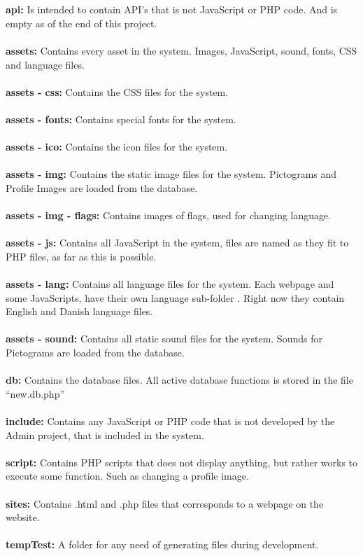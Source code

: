 \\
\\
\textbf{api:} Is intended to contain API's that is not JavaScript or PHP code. And is empty as of the end of this project.\\
\\
\textbf{assets:} Contains every asset in the system. Images, JavaScript, sound, fonts, CSS and language files.\\
\\
\textbf{assets - css:} Contains the CSS files for the system.\\
\\
\textbf{assets - fonts:} Contains special fonts for the system.\\
\\
\textbf{assets - ico:} Contains the icon files for the system.\\
\\
\textbf{assets - img:} Contains the static image files for the system. Pictograms and Profile Images are loaded from the database.\\
\\
\textbf{assets - img - flags:} Contains images of flags, used for changing language.\\
\\
\textbf{assets - js:} Contains all JavaScript in the system, files are named as they fit to PHP files, as far as this is possible.\\
\\
\textbf{assets - lang:} Contains all language files for the system. Each webpage and some JavaScripts, have their own language sub-folder . Right now they contain English and Danish language files.\\
\\
\textbf{assets - sound:} Contains all static sound files for the system. Sounds for Pictograms are loaded from the database.\\
\\
\textbf{db:} Contains the database files. All active database functions is stored in the file ``new.db.php''\\
\\
\textbf{include:} Contains any JavaScript or PHP code that is not developed by the Admin project, that is included in the system.\\
\\
\textbf{script:} Contains PHP scripts that does not display anything, but rather works to execute some function. Such as changing a profile image.\\
\\
\textbf{sites:} Contains .html and .php files that corresponds to a webpage on the website.\\
\\
\textbf{tempTest:} A folder for any need of generating files during development.

